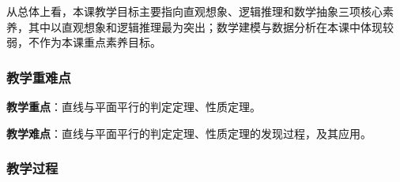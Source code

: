 \documentclass[UTF8,a4paper,12pt,twoside]{ctexart}
\begin{document}
\vspace*{-10pt}

从总体上看，本课教学目标主要指向直观想象、逻辑推理和数学抽象三项核心素养，其中以直观想象和逻辑推理最为突出；数学建模与数据分析在本课中体现较弱，不作为本课重点素养目标。

\subsubsection{教学重难点}

\textbf{教学重点}：直线与平面平行的判定定理、性质定理。

\textbf{教学难点}：直线与平面平行的判定定理、性质定理的发现过程，及其应用。

\subsubsection{教学过程}
\end{document}
